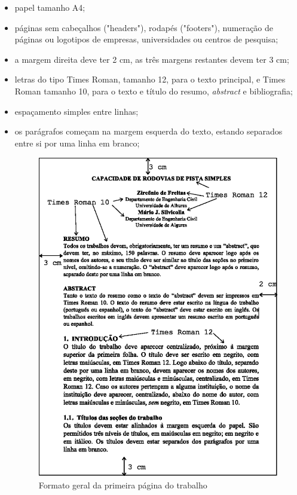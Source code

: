 \documentclass{anpet}
\begin{document}
\begin{itemize}
\item papel tamanho A4;

\item páginas sem cabeçalhos ("headers"), rodapés ("footers"), numeração de páginas ou logotipos de empresas, universidades ou centros de pesquisa;

\item a margem direita deve ter 2 cm, as três margens restantes devem  ter 3 cm;

\item letras do tipo Times Roman, tamanho 12, para o texto principal, e Times Roman tamanho 10, para o texto e título do resumo, \textit{abstract} e bibliografia;

\item espaçamento simples entre linhas;

\item os parágrafos começam na margem esquerda do texto, estando separados entre si por uma linha em branco;

\begin{figure}[H]
  \begin{center}
    \includegraphics{Figuras/Figura_1.eps}
    \caption{Formato geral da primeira página do trabalho}
    \label{fig:formato1Pag}
  \end{center}
\end{figure}


\end{itemize}
\end{document}
